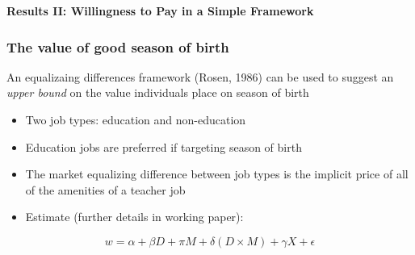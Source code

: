 \documentclass[10pt,letterpaper,subeqn]{beamer}
\begin{document}
\begin{frame}
  \begin{center}
    \textbf{Results II: Willingness to Pay in a Simple Framework}
  \end{center}
\end{frame}

\begin{frame}
\frametitle{The value of good season of birth}
An equalizaing differences framework (Rosen, 1986) can be used to suggest an \emph{upper bound}
on the value individuals place on season of birth
\begin{itemize}
\item Two job types: education and non-education
\item Education jobs are preferred if targeting season of birth
\item The market equalizing difference between job types is the implicit price of all of the amenities
  of a teacher job
\item Estimate (further details in working paper):
\end{itemize}
\[
w = \alpha + \beta D + \pi M + \delta (D \times M) + \gamma X +  \epsilon
\]
\end{frame}
\end{document}
